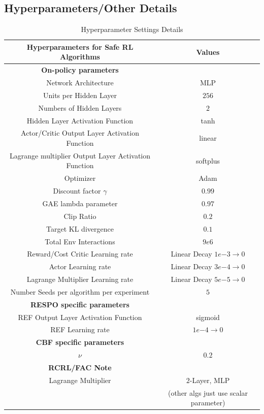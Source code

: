 \documentclass{article}
\theoremstyle{definition}
\begin{document}
\subsection{Hyperparameters/Other Details}
\begin{table}[h]
    \centering
    \begin{tabular}{c|c}
    Hyperparameters for Safe RL Algorithms & Values \\\hline
    \textbf{On-policy parameters} &\\
    Network Architecture & MLP \\
    Units per Hidden Layer & $256$ \\
    Numbers of Hidden Layers & $2$ \\
    Hidden Layer Activation Function & tanh \\
    Actor/Critic Output Layer Activation Function & linear \\
    Lagrange multiplier Output Layer Activation Function & softplus \\
    Optimizer & Adam \\
    Discount factor $\gamma$ & $0.99$ \\
    GAE lambda parameter & $0.97$ \\
    Clip Ratio & $0.2$ \\
    Target KL divergence & $0.1$ \\
    Total Env Interactions & $9e6$ \\
    Reward/Cost Critic Learning rate & Linear Decay $1e{-3}\rightarrow 0$\\
    Actor Learning rate & Linear Decay $3e{-4}\rightarrow 0$\\
    Lagrange Multiplier Learning rate & Linear Decay $5e{-5}\rightarrow 0$\\
    Number Seeds per algorithm per experiment & $5$\\\hline
    
    \textbf{RESPO specific parameters} &\\
    REF Output Layer Activation Function & sigmoid \\
    REF Learning rate & $1e{-4}\rightarrow 0$\\\hline

    \textbf{CBF specific parameters} &\\
    $\nu$ & $0.2$\\\hline
    
    \textbf{RCRL/FAC Note} &\\
    Lagrange Multiplier & $2$-Layer, MLP\\
     & (other algs just use scalar parameter) \\\hline
    
    \end{tabular}
    
    \caption{Hyperparameter Settings Details}
    \label{appendix_table:parameter_settings}
\end{table}
\end{document}
